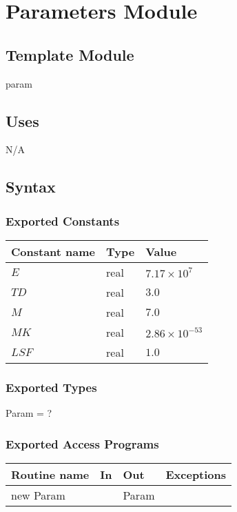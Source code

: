\documentclass[12pt,fleqn]{article}
\begin{document}
\section* {Parameters Module}

\subsection* {Template Module}

param

\subsection* {Uses}

N/A

\subsection* {Syntax}

\subsubsection* {Exported Constants}

\begin{tabular}{| l | l | l |}
\hline
\textbf{Constant name} & \textbf{Type} & \textbf{Value}\\
\hline
$E$ & real & $7.17 \times 10^{7}$\\
\hline
$TD$ & real &  $3.0$\\
\hline
$M$ & real & $7.0$\\
\hline
$MK$ & real & $2.86 \times 10^{-53}$\\
\hline
$LSF$ & real & $1.0$\\
\hline
\end{tabular}

\subsubsection* {Exported Types}

Param = ?

\subsubsection* {Exported Access Programs}

\begin{tabular}{| l | l | l | l |}
\hline
\textbf{Routine name} & \textbf{In} & \textbf{Out} & \textbf{Exceptions}\\
\hline
new Param &  & Param & ~\\
\hline
\end{tabular}
\end{document}
